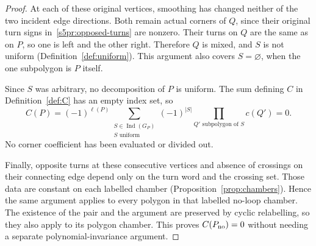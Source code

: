 \begin{proof}
At each of these original vertices, smoothing has changed neither of
the two incident edge directions. Both remain actual corners of $Q$,
since their original turn signs in~\eqref{s5pr:opposed-turns} are nonzero.
Their turns on $Q$ are the same as on $P$, so one is left and the other
right. Therefore $Q$ is mixed, and $S$ is not uniform
(Definition~\ref{def:uniform}). This argument also covers
$S=\varnothing$, when the one subpolygon is $P$ itself.

Since $S$ was arbitrary, no decomposition of $P$ is uniform. The sum
defining $C$ in Definition~\ref{def:C} has an empty index set, so
\begin{equation}\label{s5pr:empty-sum}
C(P)=(-1)^{\ell(P)}
\sum_{\substack{S\in\operatorname{Ind}(G_P)\\S\text{ uniform}}}
(-1)^{|S|}\prod_{Q'\text{ subpolygon of }S}c(Q')=0.
\end{equation}
No corner coefficient has been evaluated or divided out.

Finally, opposite turns at these consecutive vertices and absence of
crossings on their connecting edge depend only on the turn word and
the crossing set. Those data are constant on each labelled chamber
(Proposition~\ref{prop:chambers}). Hence the same argument applies to
every polygon in that labelled no-loop chamber. The existence of the
pair and the argument are preserved by cyclic relabelling, so they
also apply to its polygon chamber. This proves $C(P_{\rm no})=0$
without needing a separate polynomial-invariance argument.
\end{proof}

